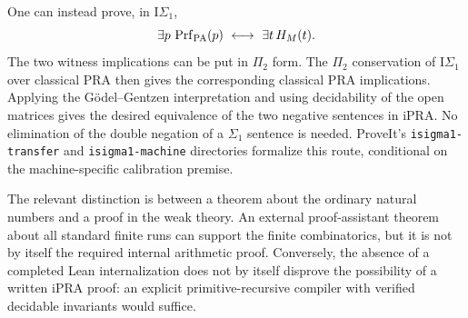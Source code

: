 One can instead prove, in $\mathrm I\Sigma_1$,
\[
 \exists p\,\operatorname{Prf}_{\rm PA}(p)
       \ \longleftrightarrow\ \exists t\,H_M(t).
\]
The two witness implications can be put in $\Pi_2$ form.  The
$\Pi_2$ conservation of $\mathrm I\Sigma_1$ over classical PRA then
gives the corresponding classical PRA implications.  Applying the
G\"odel--Gentzen interpretation and using decidability of the open
matrices gives the desired equivalence of the two negative sentences
in iPRA.  No elimination of the double negation of a $\Sigma_1$ sentence
is needed.  ProveIt's \texttt{isigma1-transfer} and
\texttt{isigma1-machine} directories formalize this route, conditional
on the machine-specific calibration premise.

The relevant distinction is between a theorem about the ordinary natural
numbers and a proof in the weak theory.  An external proof-assistant
theorem about all standard finite runs can support the finite
combinatorics, but it is not by itself the required internal arithmetic
proof.  Conversely, the absence of a completed Lean internalization does
not by itself disprove the possibility of a written iPRA proof: an
explicit primitive-recursive compiler with verified decidable invariants
would suffice.
